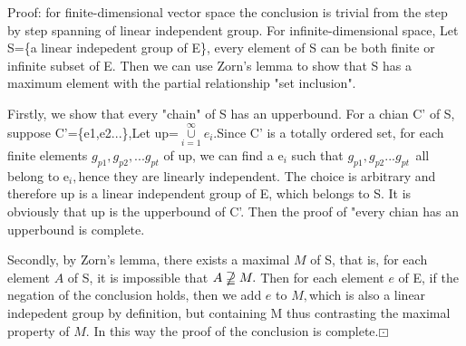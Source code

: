 \documentclass{article}
\begin{document}
Proof: for finite-dimensional
vector space the conclusion is trivial from the step by step spanning of
linear independent group. For infinite-dimensional space, Let S=\{a linear
indepedent group of E\}, every element of S can be both finite or infinite
subset of E. Then we can use Zorn's lemma to show that S has a maximum
element with the partial relationship "set inclusion". 

Firstly, we show that every "chain" of S has an upperbound. For a chian C'
of S, suppose C'=\{e1,e2...\},Let up=$\underset{i=1}{\overset{\infty }{\cup }%
}e_{i}.$Since C' is a totally ordered set, for each finite elements $%
g_{p1},g_{p2},...g_{pt}$ of up, we can find a e$_{i}$ such that $%
g_{p1},g_{p2}...g_{pt\text{ }}$all belong to e$_{i},$hence they are linearly
independent. The choice is arbitrary and therefore up is a linear
independent group of E, which belongs to S. It is obviously that up is the
upperbound of C'. Then the proof of "every chian has an upperbound is
complete.

Secondly, by Zorn's lemma, there exists a maximal $M$ of S, that is, for
each element $A$ of S, it is impossible that $A\nsupseteqq M.$ Then for each
element $e$ of E, if the negation of the conclusion holds, then we add $e$
to $M,$which is also a linear indepedent group by definition, but containing
M thus contrasting the maximal property of $M.$ In this way the proof of the
conclusion is complete.$\boxdot $ 
\end{document}
